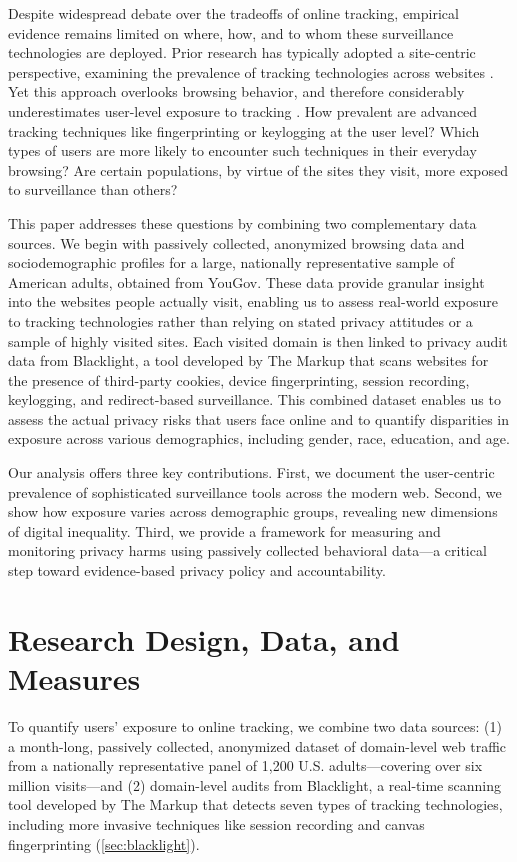 \documentclass[12pt, letterpaper]{article}
\begin{document}
Despite widespread debate over the tradeoffs of online tracking, empirical evidence remains limited on where, how, and to whom these surveillance technologies are deployed.
Prior research has typically adopted a site-centric perspective, examining the prevalence of tracking technologies across websites \citep{Acar2013, Dambra2022, Englehardt2016, Iqbal2021, karaj2018whotracks, blacklight, niforatos2021prevalence, Nikiforakis2013, SanchezRola2018, SanchezRola2021, solomos2020clashtrackersmeasuringevolution, zheutlin2021data, zheutlin2022data}.
Yet this approach overlooks browsing behavior, and therefore considerably underestimates user-level exposure to tracking \citep{Dambra2022}.
How prevalent are advanced tracking techniques like fingerprinting or keylogging at the user level? Which types of users are more likely to encounter such techniques in their everyday browsing? Are certain populations, by virtue of the sites they visit, more exposed to surveillance than others?

This paper addresses these questions by combining two complementary data sources. We begin with passively collected, anonymized browsing data and sociodemographic profiles for a large, nationally representative sample of American adults, obtained from YouGov. These data provide granular insight into the websites people actually visit, enabling us to assess real-world exposure to tracking technologies rather than relying on stated privacy attitudes or a sample of highly visited sites. Each visited domain is then linked to privacy audit data from Blacklight, a tool developed by The Markup that scans websites for the presence of third-party cookies, device fingerprinting, session recording, keylogging, and redirect-based surveillance. This combined dataset enables us to assess the actual privacy risks that users face online and to quantify disparities in exposure across various demographics, including gender, race, education, and age. 

Our analysis offers three key contributions. First, we document the user-centric prevalence of sophisticated surveillance tools across the modern web. Second, we show how exposure varies across demographic groups, revealing new dimensions of digital inequality. Third, we provide a framework for measuring and monitoring privacy harms using passively collected behavioral data—a critical step toward evidence-based privacy policy and accountability.

\section{Research Design, Data, and Measures}
To quantify users’ exposure to online tracking, we combine two data sources: (1) a month-long, passively collected, anonymized dataset of domain-level web traffic from a nationally representative panel of 1,200 U.S. adults—covering over six million visits—and (2) domain-level audits from Blacklight, a real-time scanning tool developed by The Markup that detects seven types of tracking technologies, including more invasive techniques like session recording and canvas fingerprinting (\cref{sec:blacklight}).
\end{document}
